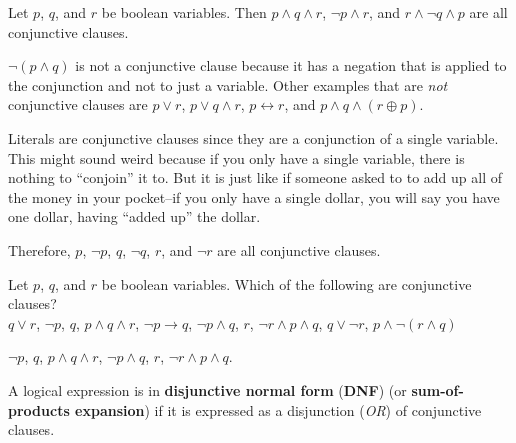 \begin{exa}
Let $p$, $q$, and $r$ be boolean variables.  
Then 
$p\wedge q\wedge r$, $\neg p\wedge r$, and $r\wedge \neg q \wedge p$ are all conjunctive clauses.


$\neg(p\wedge q)$ is not a conjunctive clause because it has a negation that is applied to the conjunction
and not to just a variable. Other examples that are {\em not} conjunctive clauses are
$p\vee r$, $p\vee q \wedge r$, $ p\leftrightarrow r$, and $p\wedge q \wedge (r\oplus p)$.
\end{exa}


\begin{exa}
Literals are conjunctive clauses since they are a conjunction of a single variable.
This might sound weird because if you only have a single variable, there is nothing to ``conjoin'' it to. 
But it is just like if someone asked to to add up all of the money in your pocket--if you only have a single 
dollar, you will say you have one dollar, having ``added up'' the dollar.

Therefore, 
$p$, $\neg p$, $q$, $\neg q$, $r$, and $\neg r$ are all conjunctive clauses.
\end{exa}

\begin{exer}
Let $p$, $q$, and $r$ be boolean variables. 
Which of the following are conjunctive clauses?\\
$q\vee r$, 
$\neg p$,
$q$, 
$p\wedge q \wedge r$, 
$\neg p \rightarrow q$, 
$\neg p \wedge q$, 
$r$, 
$\neg r \wedge p \wedge q$,
$q\vee\neg r$, 
$p \wedge \neg(r\wedge q)$
\\
\answerlinetwo
\begin{answer}
$\neg p$,
$q$, 
$p\wedge q \wedge r$, 
$\neg p \wedge q$, 
$r$, 
$\neg r \wedge p \wedge q$.
\end{answer}
\end{exer}


\begin{df}
A logical expression is in {\bf disjunctive normal form} ({\bf DNF}) 
(or {\bf sum-of-products expansion})
if it is expressed as a disjunction ({\em OR}) of conjunctive clauses.
\end{df}

